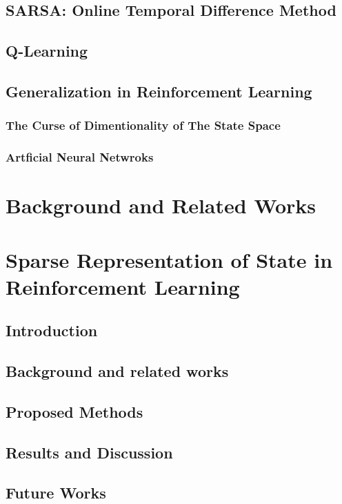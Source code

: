 \documentclass[letterpaper,titlepage]{article}
\begin{document}
\subsection{SARSA: Online Temporal Difference Method}

\subsection{Q-Learning}

\subsection{Generalization in Reinforcement Learning}
\subsubsection*{The Curse of Dimentionality of The State Space}
\label{sec:curse-of-dimentionality}

\subsubsection*{Artficial Neural Netwroks}


\section{Background and Related Works}
\newpage

\section{Sparse Representation of State in Reinforcement Learning}
\label{sec:sparse-TD-problem}

\subsection{Introduction}
\subsection{Background and related works}
\subsection{Proposed Methods}
\subsection{Results and Discussion}
\subsection{Future Works}
\end{document}
